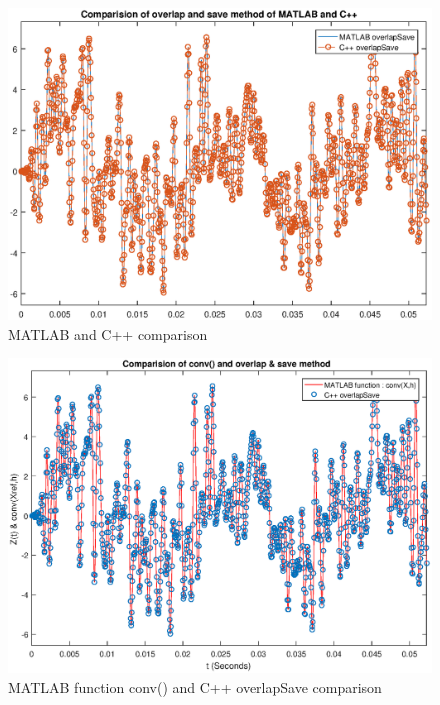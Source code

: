 \begin{figure}[h]
	\centering
	\includegraphics[width=13cm]{./algorithms/overlap_save/figures/randomNoise_matlab_and_C++.eps}
	\caption{MATLAB and C++ comparison}\label{randomNoise_matlab_and_C++}
\end{figure}

\begin{figure}[h]
	\centering
	\includegraphics[width=13cm]{./algorithms/overlap_save/figures/randomNoise_conv_and_C++.eps}
	\caption{MATLAB function conv() and C++ overlapSave comparison}\label{randomNoise_conv_and_C++}
\end{figure}

